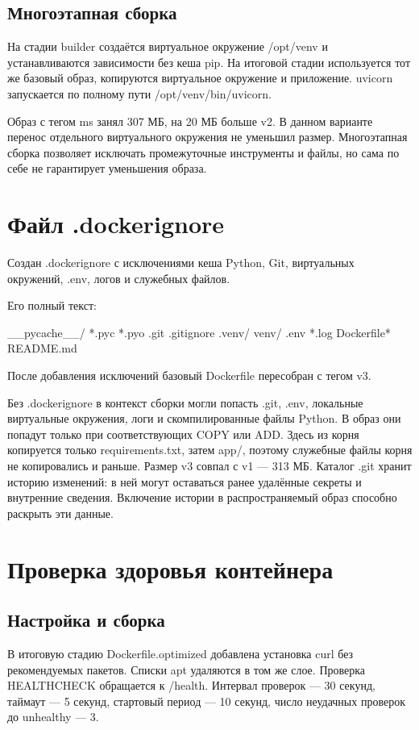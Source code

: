 \section{Многоэтапная сборка}
На стадии builder создаётся виртуальное окружение /opt/venv и устанавливаются зависимости без кеша pip. На итоговой стадии используется тот же базовый образ, копируются виртуальное окружение и приложение. uvicorn запускается по полному пути /opt/venv/bin/uvicorn.

Образ с тегом ms занял 307 МБ, на 20 МБ больше v2. В данном варианте перенос отдельного виртуального окружения не уменьшил размер. Многоэтапная сборка позволяет исключать промежуточные инструменты и файлы, но сама по себе не гарантирует уменьшения образа.

\chapter{Файл .dockerignore}
Создан .dockerignore с исключениями кеша Python, Git, виртуальных окружений, .env, логов и служебных файлов.

Его полный текст:
\begin{code}
__pycache__/
*.pyc
*.pyo
.git
.gitignore
.venv/
venv/
.env
*.log
Dockerfile*
README.md
\end{code}
После добавления исключений базовый Dockerfile пересобран с тегом v3.

Без .dockerignore в контекст сборки могли попасть .git, .env, локальные виртуальные окружения, логи и скомпилированные файлы Python. В образ они попадут только при соответствующих COPY или ADD. Здесь из корня копируется только requirements.txt, затем app/, поэтому служебные файлы корня не копировались и раньше. Размер v3 совпал с v1 --- 313 МБ.
Каталог .git хранит историю изменений: в ней могут оставаться ранее удалённые секреты и внутренние сведения. Включение истории в распространяемый образ способно раскрыть эти данные.

\chapter{Проверка здоровья контейнера}
\section{Настройка и сборка}
В итоговую стадию Dockerfile.optimized добавлена установка curl без рекомендуемых пакетов. Списки apt удаляются в том же слое.
Проверка HEALTHCHECK обращается к /health. Интервал проверок --- 30 секунд, таймаут --- 5 секунд, стартовый период --- 10 секунд, число неудачных проверок до unhealthy --- 3.

